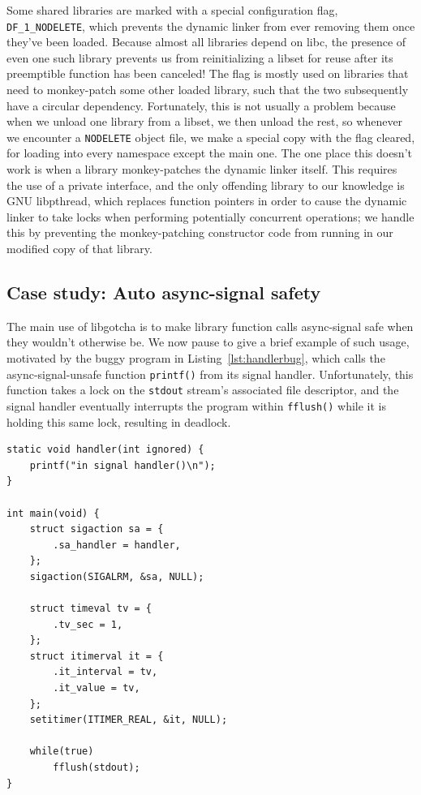 Some shared libraries are marked with a special configuration flag,
\texttt{DF\_1\_NODELETE}, which prevents the dynamic linker from ever removing them
once they've been loaded.  Because almost all libraries depend on libc, the presence
of even one such library prevents us from reinitializing a libset for reuse after
its preemptible function has been canceled!  The flag is mostly used on libraries
that need
to monkey-patch some other loaded library, such that the two subsequently have a
circular dependency.  Fortunately, this is not usually a problem because when we
unload one library from a libset, we then unload the rest, so whenever we encounter a
\texttt{NODELETE} object file, we make a special copy with the flag cleared, for
loading into every namespace except the main one.  The one place this doesn't work is
when a library monkey-patches the dynamic linker itself.  This
requires the use of a private interface, and the only offending library to our
knowledge is GNU libpthread, which replaces function pointers in order to cause the
dynamic linker to take locks when performing potentially concurrent operations; we
handle this by preventing the monkey-patching constructor code from running in our
modified copy of that library.

\subsection{Case study: Auto async-signal safety}
\label{sec:statefulness}

The main use of libgotcha is to make library function calls async-signal safe when
they wouldn't otherwise be.  We now pause to give a brief example of such usage,
motivated by the buggy program in Listing~\ref{lst:handlerbug}, which calls the
async-signal-unsafe function \texttt{printf()} from its signal handler.
Unfortunately, this function takes a lock on the \texttt{stdout} stream's associated
file descriptor, and the signal handler eventually interrupts the program within
\texttt{fflush()} while it is holding this same lock, resulting in deadlock.

\begin{lstlisting}[label=lst:handlerbug,caption=C program with a buggy signal handler]
static void handler(int ignored) {
	printf("in signal handler()\n");
}

int main(void) {
	struct sigaction sa = {
		.sa_handler = handler,
	};
	sigaction(SIGALRM, &sa, NULL);

	struct timeval tv = {
		.tv_sec = 1,
	};
	struct itimerval it = {
		.it_interval = tv,
		.it_value = tv,
	};
	setitimer(ITIMER_REAL, &it, NULL);

	while(true)
		fflush(stdout);
}
\end{lstlisting}

